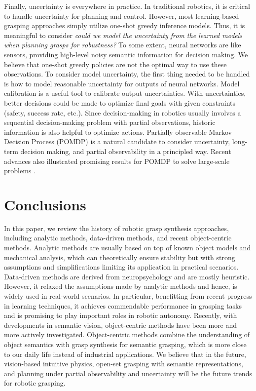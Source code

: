 \documentclass[letterpaper,10pt]{article}
\begin{document}
Finally, uncertainty is everywhere in practice.
In traditional robotics, it is critical to handle uncertainty for planning and control.
However, most learning-based grasping approaches simply utilize one-shot greedy inference models.
Thus, it is meaningful to consider {\it could we model the uncertainty from the learned models when planning grasps for robustness?}
To some extent, neural networks are like sensors, providing high-level noisy semantic information for decision making.
We believe that one-shot greedy policies are not the optimal way to use these observations.
To consider model uncertainty, the first thing needed to be handled is how to model reasonable uncertainty for outputs of neural networks.
Model calibration \cite{guo2017calibration} is a useful tool to calibrate output uncertainties.
With uncertainties, better decisions could be made to optimize final goals with given constraints (safety, success rate, etc.).
Since decision-making in robotics usually involves a sequential decision-making problem with partial observations, historic information is also helpful to optimize actions.
Partially observable Markov Decision Process (POMDP) \cite{monahan1982state} is a natural candidate to consider uncertainty, long-term decision making, and partial observability in a principled way.
Recent advances also illustrated promising results for POMDP to solve large-scale problems \cite{ye2017despot, garg2019learning}.

\section{Conclusions}
\label{sec:conclusion}

In this paper, we review the history of robotic grasp synthesis approaches, including analytic methods, data-driven methods, and recent object-centric methods.
Analytic methods are usually based on top of known object models and mechanical analysis, which can theoretically ensure stability but with strong assumptions and simplifications limiting its application in practical scenarios.
Data-driven methods are derived from neuropsychology and are mostly heuristic. However, it relaxed the assumptions made by analytic methods and hence, is widely used in real-world scenarios.
In particular, benefitting from recent progress in learning techniques, it achieves commendable performance in grasping tasks and is promising to play important roles in robotic autonomy.
Recently, with developments in semantic vision, object-centric methods have been more and more actively investigated.
Object-centric methods combine the understanding of object semantics with grasp synthesis for semantic grasping, which is more close to our daily life instead of industrial applications.
We believe that in the future, vision-based intuitive physics, open-set grasping with semantic representations, and planning under partial observability and uncertainty will be the future trends for robotic grasping.
\end{document}
